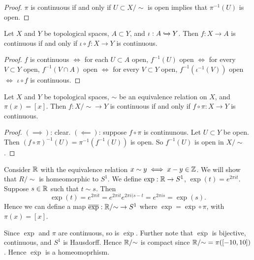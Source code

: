 \begin{proof}
	$\pi$ is continuous if and only if $U \subset X/{\sim}$ is open 
	implies that $\pi^{-1}(U)$ is open.
\end{proof}

\begin{lemma}[]
	Let $X$ and $Y$ be topological spaces, $A \subset Y$, and
	$\iota: A \xhookrightarrow{} Y$.
	Then $f: X \to A$ is continuous if and only if
	$\iota \circ f: X \to Y$ is continuous.
\end{lemma}

\begin{proof}
	$f$ is continuous $\iff$
	for each $U \subset A$ open, $f^{-1}(U)$ open $\iff$
	for every $V \subset Y$ open, $f^{-1}(V \cap A)$ open $\iff$
	for every $V \subset Y$ open, $f^{-1}(\iota^{-1}(V))$ open $\iff$
	$\iota \circ f$ is continuous.
\end{proof}

\begin{proposition}[]
	Let $X$ and $Y$ be topological spaces, $\sim$ be an equivalence relation
	on $X$, and $\pi(x) = [x]$.
	Then $f: X/{\sim} \to Y$ is continuous if and only if
	$f \circ \pi: X \to Y$ is continuous.
\end{proposition}

\begin{proof}
	$(\implies)$: clear.
	$(\impliedby)$:
	suppose $f \circ \pi$ is continunous.
	Let $U \subset Y$ be open.
	Then
	$
	(f \circ \pi)^{-1}(U) = \pi^{-1}(f^{-1}(U))$ is open.
	So $f^{-1}(U)$ is open in $X/{\sim}$.
\end{proof}

\begin{example}[]
	Consider $\mathbb{R}$ with the equivalence relation $x \sim y \iff x - y \in \mathbb{Z}$.
	We will show that $R/{\sim}$ is homeomorphic to $S^1$.
	We define $\exp: \mathbb{R} \to S^1$, $\exp(t) = e^{2\pi it}$.
	Suppose $s \in \mathbb{R}$ such that $t \sim s$.
	Then 
	\[
		\exp(t) 
		= e^{2\pi i t} 
		= e^{2\pi it} e^{2\pi i(s - t}
		= e^{2\pi is}
		= \exp(s).
	\]
	Hence we can define a map $\overline{\exp}: \mathbb{R}/{\sim} \to S^1$
	where $\exp = \overline\exp \circ \pi$,
	with $\pi(x) = [x]$.
	\begin{center}
	\end{center}
	Since $\exp$ and $\pi$ are continuous,
	so is $\overline\exp$.
	Further note that $\overline\exp$ is bijective, continuous, and
	$S^1$ is Hausdorff.
	Hence $\mathbb{R}/{\sim}$ is compact since
	$\mathbb{R}/{\sim} = \pi([-10,10])$.
	Hence $\overline\exp$ is a homeomoprhism.
\end{example}


